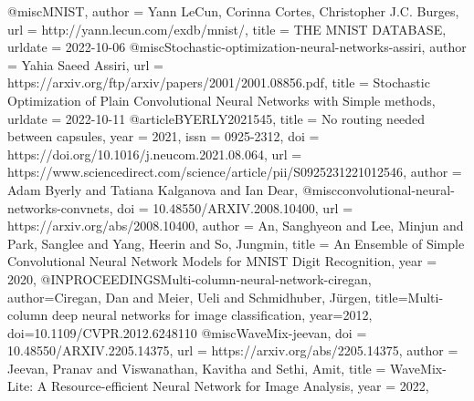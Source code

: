 @misc{MNIST,
  author = {Yann LeCun, Corinna Cortes, Christopher J.C. Burges},
  url          = {http://yann.lecun.com/exdb/mnist/},
  title        = {THE MNIST DATABASE},
  urldate      = {2022-10-06}
}
@misc{Stochastic-optimization-neural-networks-assiri,
  author = {Yahia Saeed Assiri},
  url          = {https://arxiv.org/ftp/arxiv/papers/2001/2001.08856.pdf},
  title        = {Stochastic Optimization of Plain Convolutional Neural Networks with Simple methods},
  urldate      = {2022-10-11}
}
@article{BYERLY2021545,
title = {No routing needed between capsules},
year = {2021},
issn = {0925-2312},
doi = {https://doi.org/10.1016/j.neucom.2021.08.064},
url = {https://www.sciencedirect.com/science/article/pii/S0925231221012546},
author = {Adam Byerly and Tatiana Kalganova and Ian Dear},
}
@misc{convolutional-neural-networks-convnets,
  doi = {10.48550/ARXIV.2008.10400},
  url = {https://arxiv.org/abs/2008.10400},
  author = {An, Sanghyeon and Lee, Minjun and Park, Sanglee and Yang, Heerin and So, Jungmin},
  title = {An Ensemble of Simple Convolutional Neural Network Models for MNIST Digit Recognition},
  year = {2020},
}
@INPROCEEDINGS{Multi-column-neural-network-ciregan,  
author={Ciregan, Dan and Meier, Ueli and Schmidhuber, Jürgen},    
title={Multi-column deep neural networks for image classification},   
year={2012},  
doi={10.1109/CVPR.2012.6248110}
}
@misc{WaveMix-jeevan,
  doi = {10.48550/ARXIV.2205.14375},
  url = {https://arxiv.org/abs/2205.14375},
  author = {Jeevan, Pranav and Viswanathan, Kavitha and Sethi, Amit},
  title = {WaveMix-Lite: A Resource-efficient Neural Network for Image Analysis},
  year = {2022},
  }